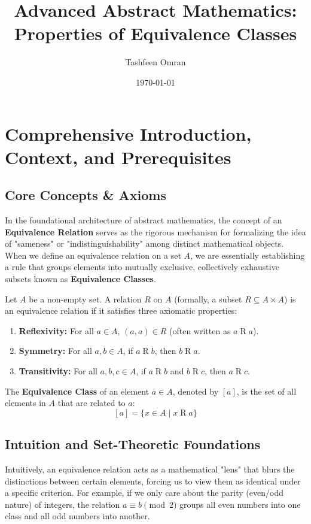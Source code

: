 \documentclass[11pt, a4paper]{article}
\title{\textbf{Advanced Abstract Mathematics: Properties of Equivalence Classes}}
\author{Tashfeen Omran}
\date{\today}
\theoremstyle{definition}
\theoremstyle{remark}
\begin{document}
\maketitle
\tableofcontents
\newpage

\section{Comprehensive Introduction, Context, and Prerequisites}

\subsection{Core Concepts \& Axioms}
In the foundational architecture of abstract mathematics, the concept of an \textbf{Equivalence Relation} serves as the rigorous mechanism for formalizing the idea of "sameness" or "indistinguishability" among distinct mathematical objects. When we define an equivalence relation on a set $A$, we are essentially establishing a rule that groups elements into mutually exclusive, collectively exhaustive subsets known as \textbf{Equivalence Classes}.

Let $A$ be a non-empty set. A relation $R$ on $A$ (formally, a subset $R \subseteq A \times A$) is an equivalence relation if it satisfies three axiomatic properties:
\begin{enumerate}
    \item \textbf{Reflexivity:} For all $a \in A$, $(a, a) \in R$ (often written as $a \mathrel{R} a$).
    \item \textbf{Symmetry:} For all $a, b \in A$, if $a \mathrel{R} b$, then $b \mathrel{R} a$.
    \item \textbf{Transitivity:} For all $a, b, c \in A$, if $a \mathrel{R} b$ and $b \mathrel{R} c$, then $a \mathrel{R} c$.
\end{enumerate}

The \textbf{Equivalence Class} of an element $a \in A$, denoted by $[a]$, is the set of all elements in $A$ that are related to $a$:
\[
    [a] = \{ x \in A \mid x \mathrel{R} a \}
\]

\subsection{Intuition and Set-Theoretic Foundations}
Intuitively, an equivalence relation acts as a mathematical "lens" that blurs the distinctions between certain elements, forcing us to view them as identical under a specific criterion. For example, if we only care about the parity (even/odd nature) of integers, the relation $a \equiv b \pmod 2$ groups all even numbers into one class and all odd numbers into another. 
\end{document}
